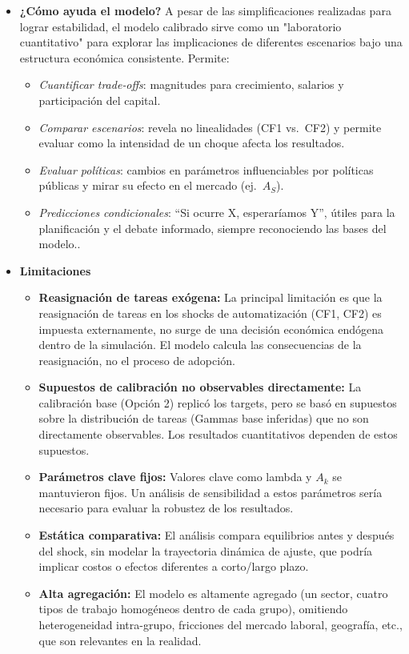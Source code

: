 \documentclass{article}
\theoremstyle{remark}
\theoremstyle{definition}
\begin{document}
\begin{enumerate}
\begin{tcolorbox}[title= Soluci\'on 7]
\begin{enumerate}[label=(\alph*)]
\begin{itemize}
  \item \textbf{¿Cómo ayuda el modelo?} A pesar de las simplificaciones realizadas para lograr estabilidad, el modelo calibrado sirve como un "laboratorio cuantitativo" para explorar las implicaciones de diferentes escenarios bajo una estructura económica consistente. Permite:
    \begin{itemize}
      \item \emph{Cuantificar trade‑offs}: magnitudes para crecimiento, salarios y participación del capital.
      \item \emph{Comparar escenarios}: revela no linealidades (CF1 vs.\ CF2) y permite evaluar como la intensidad de un choque afecta los resultados.
      \item \emph{Evaluar políticas}: cambios en parámetros influenciables por pol\'iticas p\'ublicas y mirar su efecto en el mercado (ej.\ $A_S$).
      \item \emph{Predicciones condicionales}: ``Si ocurre X, esperaríamos Y'', útiles para la planificación y el debate informado, siempre reconociendo las bases del modelo..
    \end{itemize}
  \item \textbf{Limitaciones}
    \begin{itemize}
      \item \textbf{Reasignación de tareas exógena:} La principal limitación es que la reasignación de tareas en los shocks de automatizaci\'on (CF1, CF2) es impuesta externamente, no surge de una decisión económica endógena dentro de la simulación. El modelo calcula las consecuencias de la reasignación, no el proceso de adopción.
      \item \textbf{Supuestos de calibración no observables directamente:} La calibración base (Opción 2) replicó los targets, pero se basó en supuestos sobre la distribución de tareas (Gammas base inferidas) que no son directamente observables. Los resultados cuantitativos dependen de estos supuestos.
      \item \textbf{Parámetros clave fijos:} Valores clave como lambda y $A_k$ se mantuvieron fijos. Un análisis de sensibilidad a estos parámetros sería necesario para evaluar la robustez de los resultados.
      \item \textbf{Estática comparativa:} El análisis compara equilibrios antes y después del shock, sin modelar la trayectoria dinámica de ajuste, que podría implicar costos o efectos diferentes a corto/largo plazo.
      \item \textbf{Alta agregación:} El modelo es altamente agregado (un sector, cuatro tipos de trabajo homogéneos dentro de cada grupo), omitiendo heterogeneidad intra-grupo, fricciones del mercado laboral, geografía, etc., que son relevantes en la realidad.
    \end{itemize}
\end{itemize}


\end{enumerate}
\end{tcolorbox}
\end{enumerate}
\end{document}
